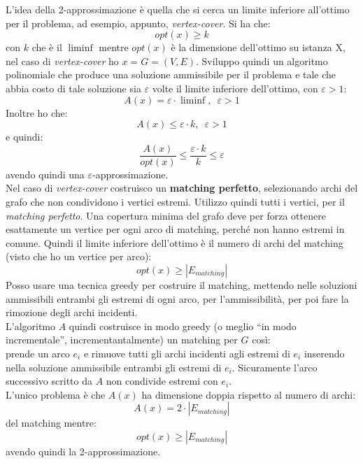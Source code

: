 														\newpage
														L'idea della 2-approssimazione è quella che si cerca un limite inferiore
														all'ottimo per il problema, ad esempio, appunto, \textit{vertex-cover}. Si ha
														che:
														\[opt(x)\geq k\]
														con $k$ che è il $\liminf$ mentre $opt(x)$ è la dimensione dell'ottimo su
														istanza X, nel caso di \textit{vertex-cover} ho $x=G=(V,E)$. Sviluppo quindi un
														algoritmo polinomiale che produce una soluzione ammissibile per il problema e
														tale che abbia costo di tale soluzione sia $\varepsilon$ volte il limite
														inferiore dell'ottimo, con $\varepsilon>1$:
														\[A(x)=\varepsilon\cdot \liminf,\,\,\,\varepsilon>1\]
														Inoltre ho che:
														\[A(x)\leq \varepsilon\cdot k,\,\,\,\varepsilon>1\]
														e quindi:
														\[\frac{A(x)}{opt(x)}\leq\frac{\varepsilon\cdot k}{k}\leq \varepsilon\]
														avendo quindi una $\varepsilon$-approssimazione.\\
														Nel caso di \textit{vertex-cover} costruisco un \textbf{matching perfetto},
														selezionando archi del grafo che non condividono i vertici estremi. Utilizzo
														quindi tutti i vertici, per il \textit{matching perfetto}. Una copertura minima
														del grafo deve per forza ottenere esattamente un vertice per ogni arco di
														matching, perché non hanno estremi in comune. Quindi il limite inferiore
														dell'ottimo è il numero di archi del matching (visto che ho un vertice per
														arco):
														\[opt(x)\geq |E_{matching}|\]
														Posso usare una tecnica greedy per costruire il matching, mettendo nelle
														soluzioni ammissibili entrambi gli estremi di ogni arco, per l'ammissibilità,
														per poi fare la rimozione degli archi incidenti.\\
														L'algoritmo $A$ quindi costruisce in modo greedy (o meglio ``in modo
														incrementale'', incrementantalmente) un matching per $G$ così:
														\\
														prende un arco $e_i$ e rimuove tutti gli archi incidenti agli estremi
														di $e_i$ inserendo nella soluzione ammissibile entrambi gli estremi di
														$e_i$. Sicuramente l'arco successivo scritto da $A$ non condivide estremi con
														$e_i$.\\
														L'unico problema è che $A(x)$ ha dimensione doppia rispetto al numero di archi:
														\[A(x)=2\cdot |E_{matching}|\]
														del matching mentre:
														\[opt(x)\geq |E_{matching}|\]
														avendo quindi la 2-approssimazione.\\
